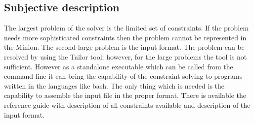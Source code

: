 \subsection{Subjective description}
The largest problem of the solver is the limited set of constraints. If the problem needs
more sophisticated constraints then the problem cannot be represented in the Minion.
The second large problem is the input format. The problem can be resolved 
by using the Tailor tool; however, for the large problems the tool is not sufficient.
However as a standalone executable which can be called from the command line it can bring the capability of 
the constraint solving to programs written in the languages like bash. The only
thing which is needed is the capability to assemble the input file in the proper format. 
There is available the reference guide with description of all constraints available and
description of the input format.